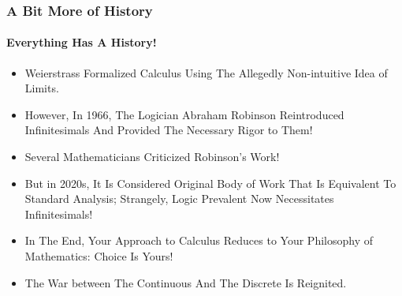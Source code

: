 \begin{frame}
\frametitle{A Bit More of History}
\framesubtitle{Everything Has A History!}
\label{slide:more-history-of-nonstandard-analysis}
\begin{itemize}
\pause
\item Weierstrass Formalized Calculus Using The Allegedly Non-intuitive Idea of \alert{Limits}.
\pause
\item However, In 1966, The Logician Abraham Robinson Reintroduced Infinitesimals And Provided The \alert{Necessary Rigor} to Them!
\pause
\item Several Mathematicians Criticized Robinson's Work!
\pause
\item But in 2020s, It Is Considered Original Body of Work That Is \alert{Equivalent To Standard Analysis}; Strangely, Logic Prevalent Now Necessitates Infinitesimals!
\pause
\item In The End, Your Approach to Calculus Reduces to \alert{Your Philosophy of Mathematics}: Choice Is Yours!
\pause
\item The War between \alert{The Continuous And The Discrete} Is Reignited.
\end{itemize}
\end{frame}
